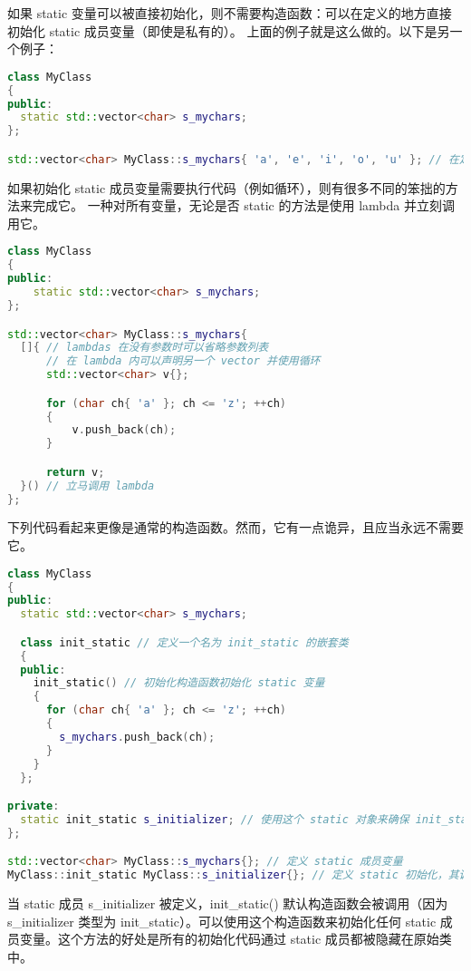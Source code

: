 \documentclass[../../LearnCpp.tex]{subfiles}
\begin{document}
如果 static 变量可以被直接初始化，则不需要构造函数：可以在定义的地方直接初始化 static 成员变量（即使是私有的）。
上面的例子就是这么做的。以下是另一个例子：

\begin{lstlisting}[language=C++]
class MyClass
{
public:
  static std::vector<char> s_mychars;
};

std::vector<char> MyClass::s_mychars{ 'a', 'e', 'i', 'o', 'u' }; // 在定义处初始化 static 变量
\end{lstlisting}

如果初始化 static 成员变量需要执行代码（例如循环），则有很多不同的笨拙的方法来完成它。
一种对所有变量，无论是否 static 的方法是使用 lambda 并立刻调用它。

\begin{lstlisting}[language=C++]
class MyClass
{
public:
    static std::vector<char> s_mychars;
};

std::vector<char> MyClass::s_mychars{
  []{ // lambdas 在没有参数时可以省略参数列表
      // 在 lambda 内可以声明另一个 vector 并使用循环
      std::vector<char> v{};

      for (char ch{ 'a' }; ch <= 'z'; ++ch)
      {
          v.push_back(ch);
      }

      return v;
  }() // 立马调用 lambda
};
\end{lstlisting}

下列代码看起来更像是通常的构造函数。然而，它有一点诡异，且应当永远不需要它。

\begin{lstlisting}[language=C++]
class MyClass
{
public:
  static std::vector<char> s_mychars;

  class init_static // 定义一个名为 init_static 的嵌套类
  {
  public:
    init_static() // 初始化构造函数初始化 static 变量
    {
      for (char ch{ 'a' }; ch <= 'z'; ++ch)
      {
        s_mychars.push_back(ch);
      }
    }
  };

private:
  static init_static s_initializer; // 使用这个 static 对象来确保 init_static 构造函数被调用
};

std::vector<char> MyClass::s_mychars{}; // 定义 static 成员变量
MyClass::init_static MyClass::s_initializer{}; // 定义 static 初始化，其调用 init_static 构造函数并初始化 s_mychars
\end{lstlisting}

当 static 成员 s\_initializer 被定义，init\_static() 默认构造函数会被调用（因为 s\_initializer 类型为 init\_static）。可以使用这个构造函数来初始化任何 static 成员变量。这个方法的好处是所有的初始化代码通过 static 成员都被隐藏在原始类中。
\end{document}
